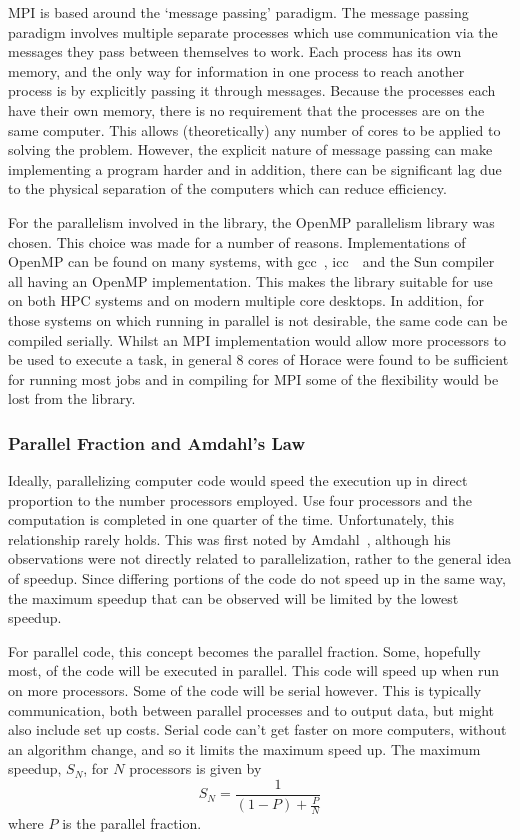 MPI is based around the `message passing' paradigm.
The message passing paradigm involves multiple separate processes which use
communication via the messages they pass between themselves to work.
Each process has its own memory, and the only way for information in one process
to reach another process is by explicitly passing it through messages.
Because the processes each have their own memory, there is no requirement that
the processes are on the same computer.
This allows (theoretically) any number of cores to be applied to solving the
problem.
However, the explicit nature of message passing can make implementing a program
harder and in addition, there can be significant lag due to the physical
separation of the computers which can reduce efficiency.

For the parallelism involved in the library, the OpenMP parallelism library was
chosen.
This choice was made for a number of reasons.
Implementations of OpenMP can be found on many systems, with gcc~\cite{gcc},
icc~\cite{icc}\ and the
Sun compiler all having an OpenMP implementation.
This makes the library suitable for use on both HPC systems and on modern
multiple core desktops.
In addition, for those systems on which running in parallel is not desirable,
the same code can be compiled serially.
Whilst an MPI implementation would allow more processors to be used to execute a
task, in general 8 cores of Horace were found to be sufficient for running most
jobs and in compiling for MPI some of the flexibility would be lost from the
library.

\subsubsection{Parallel Fraction and Amdahl's Law}

Ideally, parallelizing computer code would speed the execution up in direct
proportion to the number processors employed.
Use four processors and the computation is completed in one quarter of the time.
Unfortunately, this relationship rarely holds.
This was first noted by Amdahl~\cite{Amdalh1967}, although his observations were
not directly related to parallelization, rather to the general idea of speedup.
Since differing portions of the code do not speed up in the same way, the
maximum speedup that can be observed will be limited by the lowest speedup.

For parallel code, this concept becomes the parallel fraction.
Some, hopefully most, of the code will be executed in parallel.
This code will speed up when run on more processors.
Some of the code will be serial however.
This is typically communication, both between parallel processes and to output
data, but might also include set up costs.
Serial code can't get faster on more computers, without an algorithm change, and
so it limits the maximum speed up.
The maximum speedup, $S_N$, for $N$ processors is given by
\begin{equation}
\label{eqn:toolkit:amdahl}
S_N = \frac{1}{\left(1 - P\right) + \frac{P}{N}}
\end{equation}
where $P$ is the parallel fraction.

